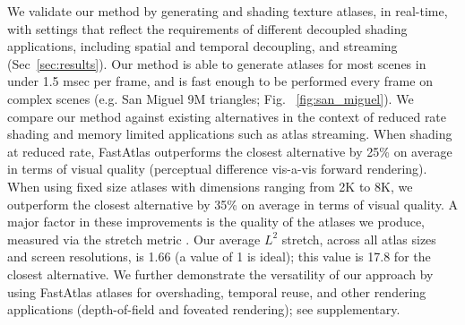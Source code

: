 We validate our method by generating and shading texture atlases, in real-time, with settings that reflect the requirements of different decoupled shading applications, including spatial and temporal decoupling, and streaming (Sec~\ref{sec:results}). 
Our method is able to generate atlases for most scenes in under 1.5 msec per frame, and is fast enough to be performed every frame on complex scenes (e.g. San Miguel 9M triangles; Fig. ~\ref{fig:san_miguel}).
We compare our method against existing alternatives in the context of reduced rate shading and memory limited applications such as atlas streaming.  When shading at reduced rate, FastAtlas outperforms the closest alternative by 25\% on average in terms of visual quality (perceptual difference vis-a-vis forward rendering). When using fixed size atlases with dimensions ranging from 2K to 8K, we outperform the closest alternative by 35\% on average in terms of visual quality. A major factor in these improvements is the quality of the atlases we produce, measured via the stretch metric \cite{sander2001texture}. Our average $L^2$ stretch, across all atlas sizes and screen resolutions, is 1.66 (a value of 1 is ideal); this value is 17.8 for the closest alternative.
We further demonstrate the versatility of our approach by using FastAtlas atlases for overshading, temporal reuse, and other rendering applications (depth-of-field and foveated rendering); see supplementary.

